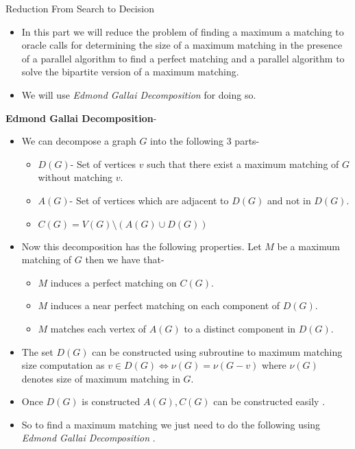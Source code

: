 \documentclass{beamer}
\begin{document}
\begin{frame}[allowframebreaks]{Reduction From Search to Decision}
	\begin{itemize}
		\item In this part we will reduce the problem of finding a maximum a matching to oracle calls for determining the size of a maximum matching in the presence of a parallel algorithm to find a perfect matching and a parallel algorithm to solve the bipartite version of a maximum matching.
		\item We will use \textit{ Edmond Gallai Decomposition} for doing so.
		 
	\end{itemize} \break
	\textbf{Edmond Gallai Decomposition}-\\
	\begin{itemize}
		\item We can decompose a graph $G$ into the following 3 parts-
		\begin{itemize}
			\item $D(G)$- Set of vertices $v$ such that there exist a maximum matching of $G$ without matching $v$.
			\item $A(G)$- Set of vertices which are adjacent to $D(G) $ and not in $D(G)$.
			\item $C(G)=V(G)\setminus(A(G) \cup D(G))$
		\end{itemize}
	\item Now this decomposition has the following properties.  Let $M$ be a maximum matching of $G$ then we have that-
	\begin{itemize}
		\item $M$ induces a perfect matching on $C(G)$.
		\item $M$ induces a near perfect matching on each component of $D(G)$.
		\item $M$ matches each vertex of $A(G) $ to a distinct component in $D(G)$.
	\end{itemize}
	\end{itemize}
	\break
	\begin{itemize}
		\item The set $D(G)$ can be constructed using subroutine to maximum matching size computation as $v\in D(G) \iff \nu(G)=\nu(G-v)$ where $\nu(G)$ denotes size of maximum matching in $G$.
		\item Once $D(G)$ is constructed $A(G),C(G)$ can be constructed easily .
		\item So to find a maximum matching we just need to do the following using \textit{Edmond Gallai Decomposition} .

\end{itemize}
\end{frame}
\end{document}
